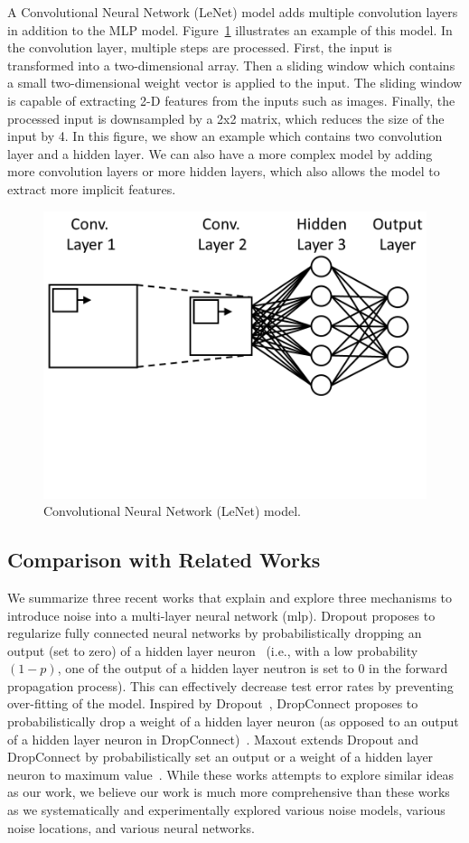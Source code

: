 A Convolutional Neural Network (LeNet) model adds multiple convolution layers in
addition to the MLP model. Figure~\ref{fig:lenet-diag} illustrates an example of this
model. In the convolution layer, multiple steps are processed. First, the input
is transformed into a two-dimensional array. Then a sliding window which
contains a small two-dimensional weight vector is applied to the input. The
sliding window is capable of extracting 2-D features from the inputs such as
images. Finally, the processed input is downsampled by a 2x2 matrix, which
reduces the size of the input by 4. In this figure, we show an example which
contains two convolution layer and a hidden layer. We can also have a more
complex model by adding more convolution layers or more hidden layers, which
also allows the model to extract more implicit features.

\begin{figure}[!h]
\centering
\includegraphics[trim=0 190 0 0,clip,width=0.6\linewidth]{f-figs/lenet-diag}
\caption{Convolutional Neural Network (LeNet) model.}
\label{fig:lenet-diag}
\end{figure}

\subsection{Comparison with Related Works}

We summarize three recent works that explain and explore three mechanisms to
introduce noise into a multi-layer neural network (mlp). Dropout proposes to
regularize fully connected neural networks by probabilistically dropping an
output (set to zero) of a hidden layer neuron~\cite{hinton2012improving} (i.e.,
with a low probability $(1-p)$, one of the output of a hidden layer neutron is
set to $0$ in the forward propagation process).  This can effectively decrease
test error rates by preventing over-fitting of the model. Inspired by
Dropout~\cite{hinton2012improving}, DropConnect proposes to probabilistically
drop a weight of a hidden layer neuron (as opposed to an output of a hidden
layer neuron in DropConnect)~\cite{wan2013dropconnect}. Maxout extends Dropout
and DropConnect by probabilistically set an output or a weight of a hidden layer
neuron to maximum value~\cite{goodfellow13maxout}. While these works attempts to
explore similar ideas as our work, we believe our work is much more
comprehensive than these works as we systematically and experimentally explored
various noise models, various noise locations, and various neural networks.



